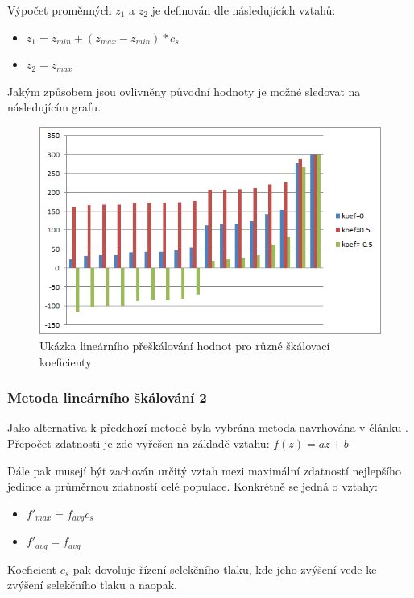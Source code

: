 \documentclass[12pt,oneside,a4paper]{article}
\begin{document}
Výpočet proměnných $z_1$ a $z_2$ je definován dle následujících vztahů:
\begin{itemize}
\item $z_1 =  z_{min} + (z_{max} - z_{min}) * c_s$
\item $z_2 = z_{max}$
\end{itemize}

Jakým způsobem jsou ovlivněny původní hodnoty je možné sledovat na následujícím grafu.

\begin{figure}[ht]
\centering
\includegraphics[scale=0.9]{obr/lin-scaling.png}
\caption{Ukázka lineárního přeškálování hodnot pro různé škálovací koeficienty}
\label{fig:figure1}
\end{figure}


\subsubsection{Metoda lineárního škálování 2}

Jako alternativa k předchozí metodě byla vybrána metoda navrhována v článku . Přepočet zdatnosti je zde vyřešen na základě vztahu:
$f(z) = az + b$

Dále pak musejí být zachován určitý vztah mezi maximální zdatností nejlepšího jedince a průměrnou zdatností celé populace. Konkrétně se jedná o vztahy:
\begin{itemize}
\item $f'_{max} = f_{avg}c_s$
\item $f'_{avg} = f_{avg}$
\end{itemize}

Koeficient $c_s$ pak dovoluje řízení selekčního tlaku, kde jeho zvýšení vede ke zvýšení selekčního tlaku a naopak.
\end{document}
